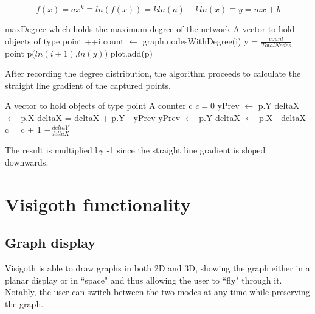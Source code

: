 \documentclass[a4paper,11pt,titlepage]{article}
\let\stdsection\section         %
\renewcommand{\section}{\newpage\stdsection}
\begin{document}
\[
  f(x) = ax^k \equiv ln(f(x)) = kln(a) + kln(x) \equiv y = mx + b
\]

\begin{algorithmic}
  \REQUIRE maxDegree which holds the maximum degree of the network
  \REQUIRE A vector to hold objects of type point
    \STATE ++i
    \STATE count $\gets$ graph.nodesWithDegree(i)
    \STATE y = $\frac{count}{Total Nodes}$
      \STATE  point p($ln(i+1)$,$ln(y)$)
      \STATE plot.add(p)
    \ENDIF
  \ENDFOR
\end{algorithmic}

After recording the degree distribution, the algorithm proceeds to
calculate the straight line gradient of the captured points.

\begin{algorithmic}
  \REQUIRE A vector to hold objects of type point
  \REQUIRE A counter c
  \STATE $c = 0$
      \STATE yPrev $\gets$ p.Y
      \STATE deltaX $\gets$ p.X
    \ELSE
      \STATE deltaX = deltaX + p.Y - yPrev
      \STATE yPrev $\gets$ p.Y
      \STATE deltaX $\gets$ p.X - deltaX
    \ENDIF
      \STATE c = c + 1
  \ENDFOR
  \RETURN $- \frac{deltaY}{deltaX}$
\end{algorithmic}

The result is multiplied by -1 since the straight line
gradient is sloped downwards.



\section{Visigoth functionality}


\subsection{Graph display}
Visigoth is able to draw graphs in both 2D and 3D, showing the graph either
 in a planar display or in ``space" and thus allowing the user to ``fly" through it.
Notably, the user can switch between the two modes at any time while preserving
the graph.
\end{document}
